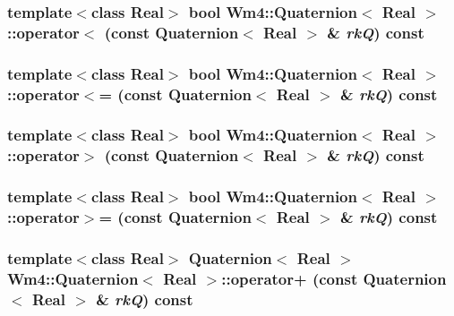 \subsubsection{\setlength{\rightskip}{0pt plus 5cm}template$<$class Real$>$ bool {\bf Wm4::Quaternion}$<$ Real $>$::operator$<$ (const {\bf Quaternion}$<$ Real $>$ \& {\em rk\-Q}) const}\label{classWm4_1_1Quaternion_8fc9a3f7f299e2f905946101e66d2d0d}


\subsubsection{\setlength{\rightskip}{0pt plus 5cm}template$<$class Real$>$ bool {\bf Wm4::Quaternion}$<$ Real $>$::operator$<$= (const {\bf Quaternion}$<$ Real $>$ \& {\em rk\-Q}) const}\label{classWm4_1_1Quaternion_9a96a03869dfd36baf811c0e44f67a34}


\subsubsection{\setlength{\rightskip}{0pt plus 5cm}template$<$class Real$>$ bool {\bf Wm4::Quaternion}$<$ Real $>$::operator$>$ (const {\bf Quaternion}$<$ Real $>$ \& {\em rk\-Q}) const}\label{classWm4_1_1Quaternion_d9e20bbdaca0df226c5eb293e28fb498}


\subsubsection{\setlength{\rightskip}{0pt plus 5cm}template$<$class Real$>$ bool {\bf Wm4::Quaternion}$<$ Real $>$::operator$>$= (const {\bf Quaternion}$<$ Real $>$ \& {\em rk\-Q}) const}\label{classWm4_1_1Quaternion_700a1803d1b5fa31db5aea71a40fa365}


\subsubsection{\setlength{\rightskip}{0pt plus 5cm}template$<$class Real$>$ {\bf Quaternion}$<$ Real $>$ {\bf Wm4::Quaternion}$<$ Real $>$::operator+ (const {\bf Quaternion}$<$ Real $>$ \& {\em rk\-Q}) const\hspace{0.3cm}{\tt  [inline]}}\label{classWm4_1_1Quaternion_853a41beda248fc365c7e4f27afeee2f}


